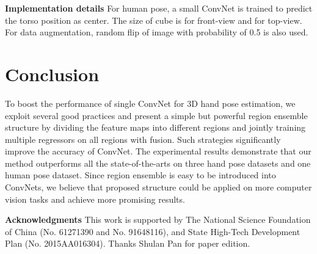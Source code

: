 \documentclass[10pt,twocolumn,letterpaper]{article}
\begin{document}
\noindent\textbf{Implementation details}\hspace{2mm} For human pose, a small ConvNet is trained to predict the torso position as center. The size of cube is  for front-view and  for top-view. For data augmentation, random flip of image with probability of 0.5 is also used. 

\section{Conclusion}
To boost the performance of single ConvNet for 3D hand pose estimation, we exploit several good practices and present a simple but powerful region ensemble structure by dividing the feature maps into different regions and jointly training multiple regressors on all regions with fusion. Such strategies significantly improve the accuracy of ConvNet. The experimental results demonstrate that our method outperforms all the state-of-the-arts on three hand pose datasets and one human pose dataset. Since region ensemble is easy to be introduced into ConvNets, we believe that proposed structure could be applied on more computer vision tasks and achieve more promising results.

\noindent\textbf{Acknowledgments}\hspace{2mm} This work is supported by The National Science Foundation of China (No. 61271390 and No. 91648116), and State High-Tech Development Plan (No. 2015AA016304). Thanks Shulan Pan for paper edition.

{\small


}
\end{document}
